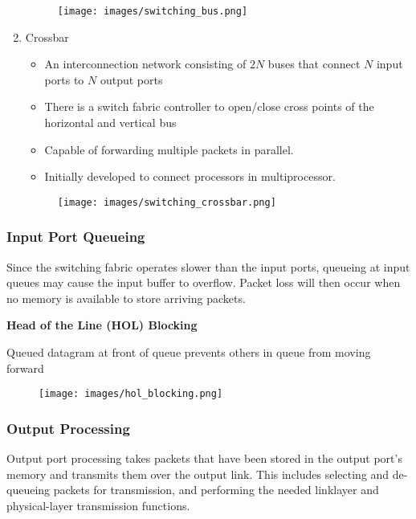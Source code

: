 \documentclass[a4paper]{article}
\begin{document}
\begin{enumerate}
\begin{itemize}
    \end{itemize}
    \begin{figure}[H]
        \centering
        \texttt{[image: images/switching\_bus.png]}
    \end{figure}
    \item Crossbar
    \begin{itemize}
        \item An interconnection network consisting of $2N$ buses that connect $N$ input ports to $N$ output ports
        \item There is a switch fabric controller to open/close cross points of the horizontal and vertical bus
        \item Capable of forwarding multiple packets in parallel.
        \item Initially developed to connect processors in multiprocessor.
    \end{itemize}
    \begin{figure}[H]
        \centering
        \texttt{[image: images/switching\_crossbar.png]}
    \end{figure}
\end{enumerate}
\subsubsection{Input Port Queueing}
Since the switching fabric operates slower than the input ports, queueing at input queues may cause the input buffer to overflow. Packet loss will then occur when no memory is available to store arriving packets.

\bigskip
\noindent\textbf{Head of the Line (HOL) Blocking}

\bigskip
\noindent Queued datagram at front of queue prevents others in queue from moving forward
\begin{figure}[H]
    \centering
    \texttt{[image: images/hol\_blocking.png]}
\end{figure}

\subsubsection{Output Processing}
Output port processing takes packets that have been stored in the output port’s memory and transmits them over the output link. This includes selecting and de-queueing packets for transmission, and performing the needed linklayer and physical-layer transmission functions.
\end{document}

